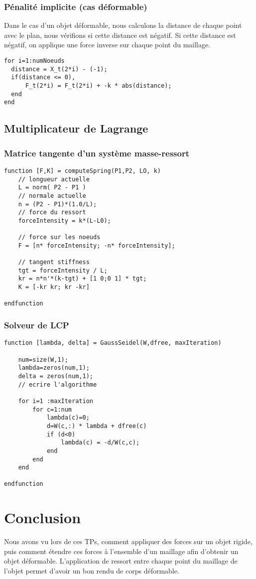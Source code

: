 \documentclass[a4paper,11pt]{article}
\begin{document}
\subsubsection{Pénalité implicite (cas déformable)}
Dans le cas d'un objet déformable, nous calculons la distance de chaque point avec le plan, nous 
vérifions si cette distance est négatif. Si cette distance est négatif, on applique une force inverse
sur chaque point du maillage.
\begin{lstlisting}
for i=1:numNoeuds
  distance = X_t(2*i) - (-1);
  if(distance <= 0),
      F_t(2*i) = F_t(2*i) + -k * abs(distance);            
  end 
end
\end{lstlisting}


\subsection{Multiplicateur de Lagrange}
\subsubsection{Matrice tangente d'un système masse-ressort}
\begin{lstlisting}[caption=Calcul de matrice tangente du système]
  function [F,K] = computeSpring(P1,P2, LO, k)
	// longueur actuelle
	L = norm( P2 - P1 )
	// normale actuelle
	n = (P2 - P1)*(1.0/L);
	// force du ressort
	forceIntensity = k*(L-L0);

	// force sur les noeuds
	F = [n* forceIntensity; -n* forceIntensity];

	// tangent stiffness 
    tgt = forceIntensity / L;
    kr = n*n'*(k-tgt) + [1 0;0 1] * tgt;
    K = [-kr kr; kr -kr]

endfunction
\end{lstlisting}
\subsubsection{Solveur de LCP}
\begin{lstlisting}[caption=Calcul de l'intensité des forces de contact]
  function [lambda, delta] = GaussSeidel(W,dfree, maxIteration)
    
    num=size(W,1);
    lambda=zeros(num,1);
    delta = zeros(num,1);
    // ecrire l'algorithme
    
    for i=1 :maxIteration
        for c=1:num
            lambda(c)=0;
            d=W(c,:) * lambda + dfree(c)
            if (d<0)
                lambda(c) = -d/W(c,c);
            end
        end
    end
    
endfunction
\end{lstlisting}
\section{Conclusion}
Nous avons vu lors de ces TPs, comment appliquer des forces sur un objet rigide, puis comment
étendre ces forces à l'ensemble d'un maillage afin d'obtenir un objet déformable. L'application
de ressort entre chaque point du maillage de l'objet permet d'avoir un bon rendu de corps déformable.
\end{document}
